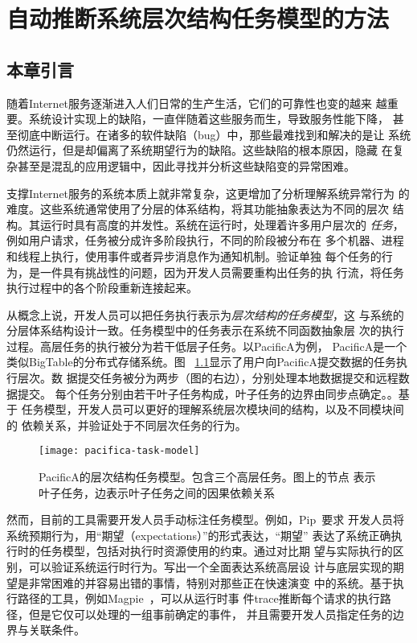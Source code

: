 \chapter{自动推断系统层次结构任务模型的方法}
\label{chap:scalpel}

\section{本章引言}

随着Internet服务逐渐进入人们日常的生产生活，它们的可靠性也变的越来
越重要。系统设计实现上的缺陷，一直伴随着这些服务而生，导致服务性能下降，
甚至彻底中断运行。在诸多的软件缺陷（bug）中，那些最难找到和解决的是让
系统仍然运行，但是却偏离了系统期望行为的缺陷。这些缺陷的根本原因，隐藏
在复杂甚至是混乱的应用逻辑中，因此寻找并分析这些缺陷变的异常困难。

支撑Internet服务的系统本质上就非常复杂，这更增加了分析理解系统异常行为
的难度。这些系统通常使用了分层的体系结构，将其功能抽象表达为不同的层次
结构。其运行时具有高度的并发性。系统在运行时，处理着许多用户层次的
\emph{任务}，例如用户请求，任务被分成许多阶段执行，不同的阶段被分布在
多个机器、进程和线程上执行，使用事件或者异步消息作为通知机制。验证单独
每个任务的行为，是一件具有挑战性的问题，因为开发人员需要重构出任务的执
行流，将任务执行过程中的各个阶段重新连接起来。

从概念上说，开发人员可以把任务执行表示为\emph{层次结构的任务模型}，这
与系统的分层体系结构设计一致。任务模型中的任务表示在系统不同函数抽象层
次的执行过程。高层任务的执行被分为若干低层子任务。以PacificA为例，
PacificA是一个类似BigTable的分布式存储系统。图~
\ref{fig:pacifica_model}显示了用户向PacificA提交数据的任务执行层次。数
据提交任务被分为两步（图的右边），分别处理本地数据提交和远程数据提交。
每个任务分别由若干{叶子任务}构成，叶子任务的边界由{同步点}确定。。基于
任务模型，开发人员可以更好的理解系统层次模块间的结构，以及不同模块间的
依赖关系，并验证处于不同层次任务的行为。

\begin{figure}
  \centering
  \begin{minipage}{0.8\linewidth}
    \centering
    \texttt{[image: pacifica-task-model]}
    \caption{PacificA的层次结构任务模型。包含三个高层任务。图上的节点
    表示叶子任务，边表示叶子任务之间的因果依赖关系}
    \label{fig:pacifica_model}
  \end{minipage}
\end{figure}

然而，目前的工具需要开发人员手动标注任务模型。例如，Pip~\cite{pip}要求
开发人员将系统预期行为，用“期望（expectations）”的形式表达，“期望”
表达了系统正确执行时的任务模型，包括对执行时资源使用的约束。通过对比期
望与实际执行的区别，可以验证系统运行时行为。写出一个全面表达系统高层设
计与底层实现的期望是非常困难的并容易出错的事情，特别对那些正在快速演变
中的系统。基于执行路径的工具，例如Magpie~\cite{magpie}，可以从运行时事
件trace推断每个请求的执行路径，但是它仅可以处理的一组事前确定的事件，
并且需要开发人员指定任务的边界与关联条件。

